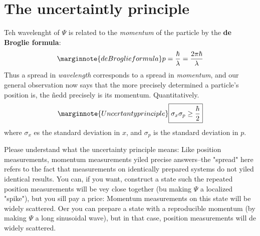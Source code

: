 \section{The uncertaintly principle}
Teh wavelenght of $\Psi$ is related to the \textit{momentum} of the particle by the \textbf{de Broglie formula}:
\begin{equation}\label{1.39}\marginnote{deBroglie formula}
	p=\frac{\hbar}{\lambda}=\frac{2\pi\hbar}{\lambda}
\end{equation}
Thus a spread in \textit{wavelength} corresponds to a spread in \textit{momentum}, and our general observation now says that the more precisely determined a particle's position is, the ñedd precisely is its momentum. Quantitatively.
\begin{equation}\label{1.40}\marginnote{Uncertanty principle}
	\boxed{\sigma_x\sigma_p\geq\frac{\hbar}{2}}
\end{equation}
where $\sigma_x$ es the standard deviation in $x$, and $\sigma_p$ is the standard deviation in $p$.

Please understand what the uncertainty principle means: Like position measurements, momentum measurements yiled precise answers--the "spread" here refers to the fact that measurements on identically prepared systems do not yiled identical results. You can, if you want, construct a state such the repeated position measurements will be vey close together (bu making $\Psi$ a localized "spike"), but you sill pay a price: Momentum measurements on this state will be widely scattered. Oer you can prepare a state with a reproducible momentum (by making $\Psi$ a long sinusoidal wave), but in that case, position measurements will de widely scattered.
